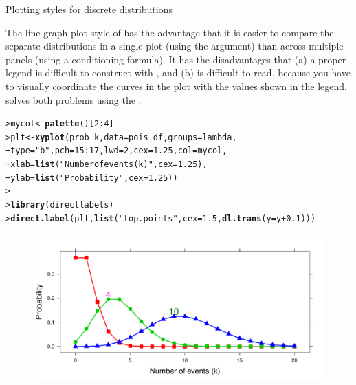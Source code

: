 \documentclass[10pt,krantz2]{krantz}\usepackage[]{graphicx}\usepackage[]{color}
\makeatletter
\newcommand{\hlnum}[1]{\textcolor[rgb]{0.686,0.059,0.569}{#1}}%
\newcommand{\hlstr}[1]{\textcolor[rgb]{0.192,0.494,0.8}{#1}}%
\newcommand{\hlopt}[1]{\textcolor[rgb]{0,0,0}{#1}}%
\newcommand{\hlstd}[1]{\textcolor[rgb]{0.345,0.345,0.345}{#1}}%
\newcommand{\hlkwb}[1]{\textcolor[rgb]{0.69,0.353,0.396}{#1}}%
\newcommand{\hlkwc}[1]{\textcolor[rgb]{0.333,0.667,0.333}{#1}}%
\newcommand{\hlkwd}[1]{\textcolor[rgb]{0.737,0.353,0.396}{\textbf{#1}}}%
\newenvironment{kframe}{%
 \def\at@end@of@kframe{}%
 \ifinner\ifhmode%
  \def\at@end@of@kframe{\end{minipage}}%
  \begin{minipage}{\columnwidth}%
 \fi\fi%
 \def\FrameCommand##1{\hskip\@totalleftmargin \hskip-\fboxsep
 \colorbox{shadecolor}{##1}\hskip-\fboxsep
     \hskip-\linewidth \hskip-\@totalleftmargin \hskip\columnwidth}%
 \MakeFramed {\advance\hsize-\width
   \@totalleftmargin\z@ \linewidth\hsize
   \@setminipage}}%
 {\par\unskip\endMakeFramed%
 \at@end@of@kframe}
\newenvironment{knitrout}{}{} %
\renewenvironment{knitrout}{\small\renewcommand{\baselinestretch}{.85}}{} %
\makeatother
\begin{document}
\begin{Example}{Plotting styles for discrete distributions}
\begin{knitrout}
\end{knitrout}

The line-graph plot style of  has the advantage that
it is easier to compare the separate distributions in a single plot
(using the  argument) than
across multiple panels (using a conditioning formula).
It has the disadvantages that (a) a proper legend is
difficult to construct with , and (b) is difficult to read, because
you have to visually coordinate the curves in the plot with the values shown
in the legend.   solves both problems using
the .
\begin{knitrout}
\color{fgcolor}\begin{kframe}
\begin{alltt}
\hlstd{> }\hlstd{mycol} \hlkwb{<-} \hlkwd{palette}\hlstd{()[}\hlnum{2}\hlopt{:}\hlnum{4}\hlstd{]}
\hlstd{> }\hlstd{plt} \hlkwb{<-} \hlkwd{xyplot}\hlstd{(prob} \hlopt{~} \hlstd{k,} \hlkwc{data} \hlstd{= pois_df,} \hlkwc{groups} \hlstd{= lambda,}
\hlstd{+ }  \hlkwc{type} \hlstd{=} \hlstr{"b"}\hlstd{,} \hlkwc{pch} \hlstd{=} \hlnum{15} \hlopt{:} \hlnum{17}\hlstd{,} \hlkwc{lwd} \hlstd{=} \hlnum{2}\hlstd{,} \hlkwc{cex} \hlstd{=} \hlnum{1.25}\hlstd{,} \hlkwc{col} \hlstd{= mycol,}
\hlstd{+ }  \hlkwc{xlab} \hlstd{=} \hlkwd{list}\hlstd{(}\hlstr{"Number of events (k)"}\hlstd{,} \hlkwc{cex} \hlstd{=} \hlnum{1.25}\hlstd{),}
\hlstd{+ }  \hlkwc{ylab} \hlstd{=} \hlkwd{list}\hlstd{(}\hlstr{"Probability"}\hlstd{,}  \hlkwc{cex} \hlstd{=} \hlnum{1.25}\hlstd{))}
\hlstd{> }	
\hlstd{> }\hlkwd{library}\hlstd{(directlabels)}
\hlstd{> }\hlkwd{direct.label}\hlstd{(plt,} \hlkwd{list}\hlstd{(}\hlstr{"top.points"}\hlstd{,} \hlkwc{cex} \hlstd{=} \hlnum{1.5}\hlstd{,} \hlkwd{dl.trans}\hlstd{(}\hlkwc{y} \hlstd{= y} \hlopt{+} \hlnum{0.1}\hlstd{)))}
\end{alltt}
\end{kframe}\begin{figure}[!htbp]

\centerline{\includegraphics[width=.8\textwidth]{ch03/fig/dpois-xyplot2-1} }


\end{figure}
\end{knitrout}
\end{Example}
\end{document}
